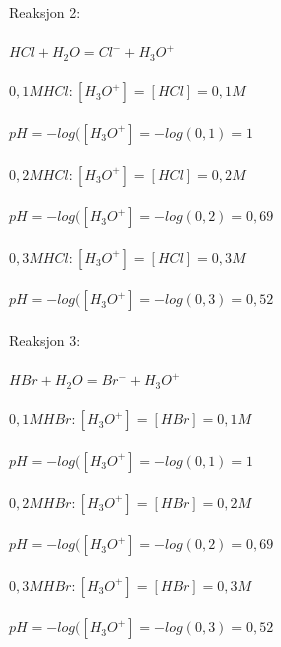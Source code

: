 \documentclass{minmal}
\begin{document}
\noindent Reaksjon 2:\\\\
$HCl+H_2O=Cl^-+H_3O^+$\\\\
$0,1M HCl: [H_3O^+]=[HCl]=0,1M$\\\\
$pH=-log([H_3O^+]=-log(0,1)=1$\\\\
$0,2M HCl: [H_3O^+]=[HCl]=0,2M$\\\\
$pH=-log([H_3O^+]=-log(0,2)=0,69$\\\\
$0,3M HCl: [H_3O^+]=[HCl]=0,3M$\\\\
$pH=-log([H_3O^+]=-log(0,3)=0,52$\\\\
\noindent Reaksjon 3:\\\\
$HBr+H_2O=Br^-+H_3O^+$\\\\
$0,1M HBr: [H_3O^+]=[HBr]=0,1M$\\\\
$pH=-log([H_3O^+]=-log(0,1)=1$\\\\
$0,2M HBr: [H_3O^+]=[HBr]=0,2M$\\\\
$pH=-log([H_3O^+]=-log(0,2)=0,69$\\\\
$0,3M HBr: [H_3O^+]=[HBr]=0,3M$\\\\
$pH=-log([H_3O^+]=-log(0,3)=0,52$\\\\
\end{document}
